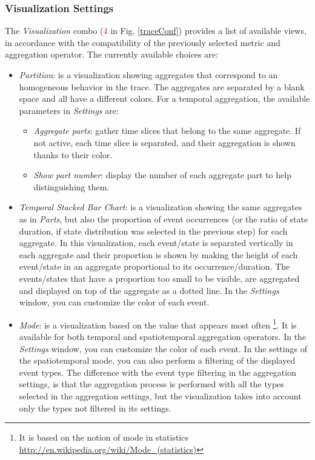 \documentclass[twoside]{article}
\begin{document}
\begin{sloppypar}
\subsubsection{Visualization Settings}
\label{visuop}
The \textit{Visualization} combo (\textcolor{red}{4} in Fig. \ref{traceConf}) provides a list of available views, in accordance with the compatibility of the previously selected metric and aggregation operator. The currently available choices are:
\begin{itemize}
	\item \textit{Partition}: is a visualization showing aggregates that correspond to an homogeneous behavior in the trace. The aggregates are separated by a blank space and all have a different colors. For a temporal aggregation, the available parameters in \textit{Settings} are:
	\begin{itemize}
		\item \textit{Aggregate parts}: gather time slices that belong to the same aggregate. If not active, each time slice is separated, and their aggregation is shown thanks to their color.
		\item \textit{Show part number}: display the number of each aggregate part to help distinguishing them.
	\end{itemize}
	\item \textit{Temporal Stacked Bar Chart}: is a visualization showing the same aggregates as in \textit{Parts}, but also the proportion of event occurrences (or the ratio of state duration, if state distribution was selected in the previous step) for each aggregate. In this visualization, each event/state is separated vertically in each aggregate and their proportion is shown by making the height of each event/state in an aggregate proportional to its occurrence/duration. The events/states that have a proportion too small to be visible, are aggregated and displayed on top of the aggregate as a dotted line. In the \textit{Settings} window, you can customize the color of each event.
	\item \textit{Mode}: is a visualization based on the value that appears most often \footnote{It is based on the notion of mode in statistics \url{http://en.wikipedia.org/wiki/Mode_(statistics)}}. It is available for both temporal and spatiotemporal aggregation operators. In the \textit{Settings} window, you can customize the color of each event. In the settings of the spatiotemporal mode, you can also perform a filtering of the displayed event types. The difference with the event type filtering in the aggregation settings, is that the aggregation process is performed with all the types selected in the aggregation settings, but the visualization takes into account only the types not filtered in its settings. 
\end{itemize}


\end{sloppypar}
\end{document}
